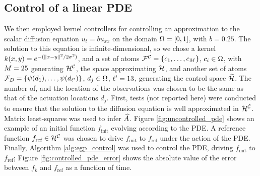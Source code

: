\subsection{Control of a linear PDE} %
We then employed kernel controllers for controlling an approximation to the scalar diffusion equation $u_t = bu_{xx}$ on the domain $\Omega=[0,1]$, with $b=0.25$. The solution to this equation is infinite-dimensional, so we chose a kernel $k(x,y) = e^{-(\|x-y\|^2/2\sigma^2)}$, and a set of atoms  $\mathcal{F}^{\mathcal{C}}=\{c_1,\dots,c_{M}\}$, $c_i\in\Omega$, with $M = 25$ generating $\mathcal{H}^{\mathcal{C}}$, the space approximating $\mathcal{H}$, and another set of atoms $\mathcal{F}_{D}=\{\psi(d_1),\dots,\psi(d_{\ell'})\}$, $d_j\in\Omega$,
$\ell'=13$, generating the control space $\widetilde{\mathcal{H}}$. The number of, and the location of the observations was chosen to be the same as that of the actuation locations $d_j$. First, tests (not reported here) were conducted to ensure that the solution to the diffusion equation is well approximated in $\mathcal{H}^{\mathcal{C}}$. Matrix least-squares was used to infer $\widehat{A}$. Figure \ref{fig:uncontrolled_pde} shows an example of an initial function $f_{\text{init}}$ evolving according to the PDE.  A reference function $f_{\text{ref}}\in\mathcal{H}^{\mathcal{C}}$ was chosen to drive $f_{\text{init}}$ to $f_{\text{ref}}$ under the action of the PDE. Finally, Algorithm \ref{alg:egp_control} was used to control the PDE, driving $f_{\text{init}}$ to $f_{\text{ref}}$; Figure \ref{fig:controlled_pde_error} shows the absolute value of the error between $f_k $ and $f_{\text{ref}}$ as a function of time. 

% 
% 			

